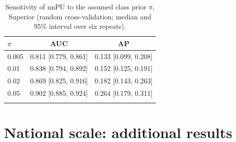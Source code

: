 \documentclass[pdflatex,sn-apa]{sn-jnl}
\begin{document}
\begin{appendices}
\begin{table}[!h]
\caption{Sensitivity of nnPU to the assumed class prior $\pi$, Superior (random cross-validation; median and 95\% interval over six repeats).}\label{tab:prior}
\footnotesize
\begin{tabular*}{0.6\textwidth}{@{\extracolsep\fill}lcc}
\toprule
$\pi$ & AUC & AP \\
\midrule
0.005 & 0.811 [0.779, 0.861] & 0.133 [0.099, 0.208] \\
0.01 & 0.838 [0.794, 0.892] & 0.152 [0.125, 0.191] \\
0.02 & 0.869 [0.825, 0.916] & 0.182 [0.143, 0.263] \\
0.05 & 0.902 [0.885, 0.924] & 0.264 [0.179, 0.311] \\
\botrule
\end{tabular*}
\end{table}

\clearpage
\section{National scale: additional results}\label{app:national}


\end{appendices}
\end{document}
